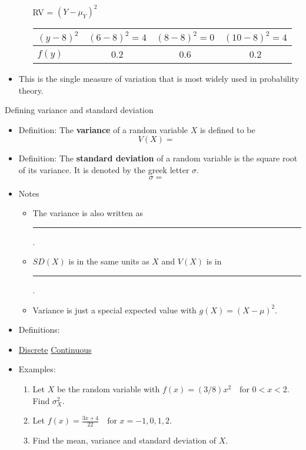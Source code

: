 \documentclass{article}
\newcommand{\blankul}[1]{\rule[-1.5mm]{#1}{0.15mm}}	%
\begin{document}
\begin{itemize}
\begin{enumerate}[(a)]
\begin{tabular}{| l || c | c | c |}
        \end{tabular}\bigskip\\
        RV = $(Y - \mu_Y)^2$ \hspace{10pt}
        \begin{tabular}{| l || c | c | c |}
            \hline
             $(y - 8)^2$ & $(6 - 8)^2 = 4$ & $(8 - 8)^2 = 0$ & $(10 - 8)^2 = 4$ \\
            \hline
            $f(y)$ & 0.2 & 0.6 & 0.2 \\
            \hline
        \end{tabular}\vspace{50pt}
    \end{enumerate}
    \item This is the single measure of variation that is most widely used in probability theory.
\end{itemize}\bigskip

Defining variance and standard deviation\bigskip
\begin{itemize}
    \item Definition: The \textbf{variance} of a random variable $X$ is defined to be
    \[V(X) = \hspace{10pt}\]
    \item Definition: The \textbf{standard deviation} of a random variable is the square root of its variance. It is denoted by the greek letter $\sigma$.
    \[\sigma = \hspace{10pt}\]
    \item Notes
    \begin{itemize}
        \item The variance is also written as \blankul{1cm}.
        \item $SD(X)$ is in the same units as $X$ and $V(X)$ is in \blankul{2cm}.
        \item Variance is just a special expected value with $g(X) = (X -\mu)^2$.\bigskip
    \end{itemize}\bigskip
    \item Definitions:
    \item[] \hspace{20pt} \ul{Discrete} \hspace{100pt} \ul{Continuous}\vspace{40pt}
    \item Examples:
    \begin{enumerate}
        \item Let $X$ be the random variable with $f(x) = (3/8)x^2 \quad \text{for } 0 < x < 2$. Find $\sigma^2_X$.\vspace{200pt}
        \item Let $\displaystyle f(x) = \frac{3x + 4}{22} \quad \text{for } x = -1, 0, 1, 2$.
        \item[] Find the mean, variance and standard deviation of $X$.\vspace{150pt}
    \end{enumerate}
\end{itemize}\bigskip
\end{document}
